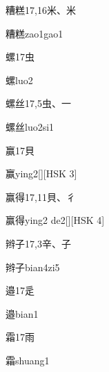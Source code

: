 \begin{entry}{糟糕}{17,16}{⽶、⽶}
  \begin{phonetics}{糟糕}{zao1gao1}
  \end{phonetics}
\end{entry}

\begin{entry}{螺}{17}{⾍}
  \begin{phonetics}{螺}{luo2}
  \end{phonetics}
\end{entry}

\begin{entry}{螺丝}{17,5}{⾍、⼀}
  \begin{phonetics}{螺丝}{luo2si1}
  \end{phonetics}
\end{entry}

\begin{entry}{赢}{17}{⾙}
  \begin{phonetics}{赢}{ying2}[][HSK 3]
  \end{phonetics}
\end{entry}

\begin{entry}{赢得}{17,11}{⾙、⼻}
  \begin{phonetics}{赢得}{ying2 de2}[][HSK 4]
  \end{phonetics}
\end{entry}

\begin{entry}{辫子}{17,3}{⾟、⼦}
  \begin{phonetics}{辫子}{bian4zi5}
  \end{phonetics}
\end{entry}

\begin{entry}{邉}{17}{⾡}
  \begin{phonetics}{邉}{bian1}
  \end{phonetics}
\end{entry}

\begin{entry}{霜}{17}{⾬}
  \begin{phonetics}{霜}{shuang1}
  \end{phonetics}
\end{entry}

